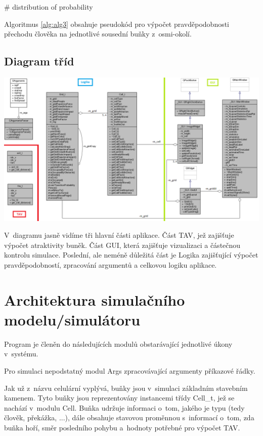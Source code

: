 \documentclass[11pt, titlepage, a4paper]{article}
\begin{document}
\begin{algorithm}
\begin{algorithmic}[1]
    \State \# distribution \hspace*{0.1cm} of \hspace*{0.1cm} probability
    \EndProcedure
    \end{algorithmic}
    \end{algorithm}

    Algoritmus \ref{alg:alg3} obsahuje pseudokód pro výpočet pravděpodobnosti přechodu člověka na jednotlivé sousední buňky z~osmi-okolí.

    \subsection{Diagram tříd}
    \hspace*{-0.5cm}\includegraphics[scale=0.45]{class_diagram.png}
    
    V~diagramu jasně vidíme tři hlavní části aplikace. Část TAV, jež zajišťuje výpočet atraktivity buněk. Část GUI, která zajišťuje vizualizaci a částečnou kontrolu simulace. Poslední, ale neméně důležitá část je Logika zajišťující výpočet pravděpodobností, zpracování argumentů a celkovou logiku aplikace. 

\section{Architektura simulačního modelu/simulátoru} \label{sec:implementation}
    Program je členěn do následujících modulů obstarávající jednotlivé úkony v~systému.
    
    Pro simulaci nepodstatný modul Args zpracovávající argumenty příkazové řádky.
    
    Jak už z~názvu celulární vyplývá, buňky jsou v~simulaci základním stavebním kamenem. Tyto buňky jsou reprezentovány instancemi třídy Cell\_t, jež se nachází v~modulu Cell. Buňka udržuje informaci o~tom, jakého je typu (tedy člověk, překážka, ...), dále obsahuje stavovou proměnnou s~informací o~tom, zda buňka hoří, směr posledního pohybu a~hodnoty potřebné pro výpočet TAV.
    
\end{document}
